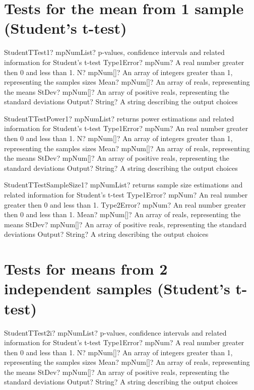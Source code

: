 \documentclass[12pt,a4paper,openany]{book}
\begin{document}
\section{Tests for the mean from 1 sample (Student's t-test)}

\begin{mpFunctionsExtract}
\mpFunctionFiveNotImplemented
{StudentTTest1? mpNumList? p-values, confidence intervals and related information for Student's t-test}
{Type1Error? mpNum? A real number greater then 0 and less than 1.}
{N? mpNum[]? An array of integers greater than 1, representing the samples sizes}
{Mean? mpNum[]? An array of reals, representing the means}
{StDev? mpNum[]? An array of positive reals, representing the standard deviations}
{Output? String? A string describing the output choices}
\end{mpFunctionsExtract}

\begin{mpFunctionsExtract}
\mpFunctionFiveNotImplemented
{StudentTTestPower1? mpNumList? returns power estimations and related information for Student's t-test}
{Type1Error? mpNum? An real number greater then 0 and less than 1.}
{N? mpNum[]? An array of integers greater than 1, representing the samples sizes}
{Mean? mpNum[]? An array of reals, representing the means}
{StDev? mpNum[]? An array of positive reals, representing the standard deviations}
{Output? String? A string describing the output choices}
\end{mpFunctionsExtract}

\begin{mpFunctionsExtract}
\mpFunctionFiveNotImplemented
{StudentTTestSampleSize1? mpNumList? returns sample size estimations and related information for Student's t-test}
{Type1Error? mpNum? An real number greater then 0 and less than 1.}
{Type2Error? mpNum? An real number greater then 0 and less than 1.}
{Mean? mpNum[]? An array of reals, representing the means}
{StDev? mpNum[]? An array of positive reals, representing the standard deviations}
{Output? String? A string describing the output choices}
\end{mpFunctionsExtract}

\section{Tests for means from 2 independent samples (Student's t-test)}

\begin{mpFunctionsExtract}
\mpFunctionFiveNotImplemented
{StudentTTest2i? mpNumList? p-values, confidence intervals and related information for Student's t-test}
{Type1Error? mpNum? A real number greater then 0 and less than 1.}
{N? mpNum[]? An array of integers greater than 1, representing the samples sizes}
{Mean? mpNum[]? An array of reals, representing the means}
{StDev? mpNum[]? An array of positive reals, representing the standard deviations}
{Output? String? A string describing the output choices}
\end{mpFunctionsExtract}
\end{document}
